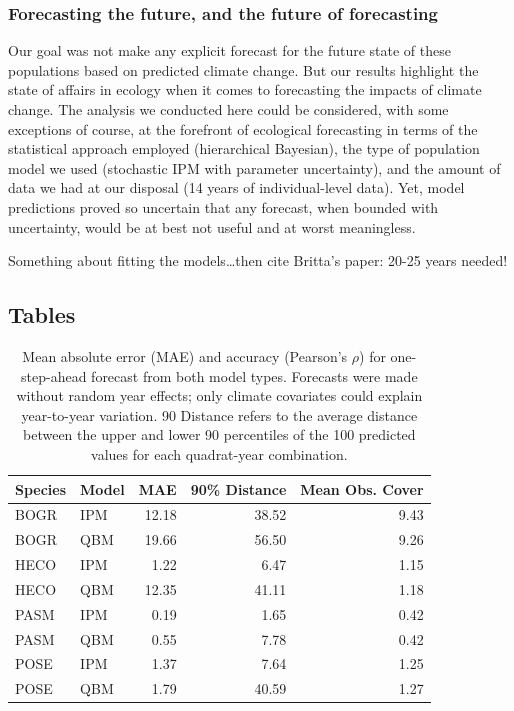 \documentclass[12pt,]{article}
\begin{document}
\subsubsection{Forecasting the future, and the future of
forecasting}\label{forecasting-the-future-and-the-future-of-forecasting}

Our goal was not make any explicit forecast for the future state of
these populations based on predicted climate change. But our results
highlight the state of affairs in ecology when it comes to forecasting
the impacts of climate change. The analysis we conducted here could be
considered, with some exceptions of course, at the forefront of
ecological forecasting in terms of the statistical approach employed
(hierarchical Bayesian), the type of population model we used
(stochastic IPM with parameter uncertainty), and the amount of data we
had at our disposal (14 years of individual-level data). Yet, model
predictions proved so uncertain that any forecast, when bounded with
uncertainty, would be at best not useful and at worst meaningless.

Something about fitting the models\ldots{}then cite Britta's paper:
20-25 years needed!

\pagebreak{}

\subsection{Tables}\label{tables}

\begin{table}[ht]
\centering
\caption{Mean absolute error (MAE) and accuracy (Pearson's $\rho$) for one-step-ahead forecast from both model types. Forecasts were made without random year effects; only climate covariates could explain year-to-year variation. 90 Distance refers to the average distance between the upper and lower 90 percentiles of the 100 predicted values for each quadrat-year combination.} 
\begin{tabular}{llrrr}
  \hline
Species & Model & MAE & 90\% Distance & Mean Obs. Cover \\ 
  \hline
BOGR & IPM & 12.18 & 38.52 & 9.43 \\ 
  BOGR & QBM & 19.66 & 56.50 & 9.26 \\ 
  HECO & IPM & 1.22 & 6.47 & 1.15 \\ 
  HECO & QBM & 12.35 & 41.11 & 1.18 \\ 
  PASM & IPM & 0.19 & 1.65 & 0.42 \\ 
  PASM & QBM & 0.55 & 7.78 & 0.42 \\ 
  POSE & IPM & 1.37 & 7.64 & 1.25 \\ 
  POSE & QBM & 1.79 & 40.59 & 1.27 \\ 
   \hline
\end{tabular}
\end{table}
\end{document}
